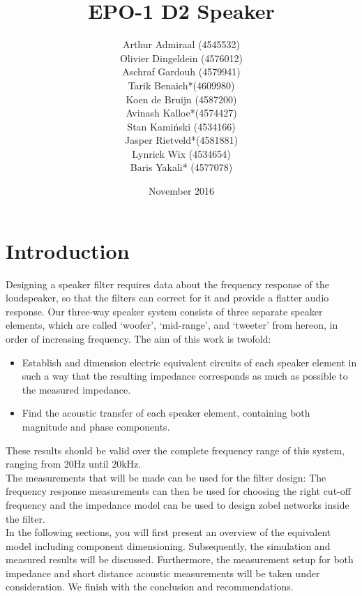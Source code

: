 \documentclass{article}
\title{EPO-1 D2 Speaker \rom{2}}
\author{Arthur Admiraal (4545532)\\
Olivier Dingeldein (4576012)\\
Aschraf Gardouh (4579941)\\
Tarik Benaich*(4609980)\\
Koen de Bruijn (4587200)\\
Avinash Kalloe*(4574427)\\
Stan Kamiński  (4534166)\\
Jasper Rietveld*(4581881)\\
Lynrick Wix (4534654)\\
Baris Yakali* (4577078)}
\date{November 2016}
\begin{document}
\begin{titlepage}
  \maketitle
\end{titlepage}
\tableofcontents\newpage

\section{Introduction} 
Designing a speaker filter requires data about the frequency response of the loudspeaker, so that the filters can correct for it and provide a flatter audio response. Our three-way speaker system consists of three separate speaker elements, which are called `woofer', `mid-range', and `tweeter' from hereon, in order of increasing frequency. The aim of this work is twofold:
\begin{itemize}
  \item Establish and dimension electric equivalent circuits of each speaker element in such a way that the resulting impedance corresponds as much as possible to the measured impedance.
  \item Find the acoustic transfer of each speaker element, containing both magnitude and phase components.
\end{itemize} 
These results should be valid over the complete frequency range of this system, ranging from $20\si{\hertz}$ until $20\si{\kilo\hertz}$.\\ 
\newline
The measurements that will be made can be used for the filter design: The frequency response measurements can then be used for choosing the right cut-off frequency and the impedance model can be used to design zobel networks inside the filter.\\ 
\newline
In the following sections, you will first present an overview of the equivalent model including component dimensioning. Subsequently, the simulation and measured results will be discussed. Furthermore, the measurement setup for both impedance and short distance acoustic measurements will be taken under consideration. We finish with the conclusion and recommendations.
\end{document}
